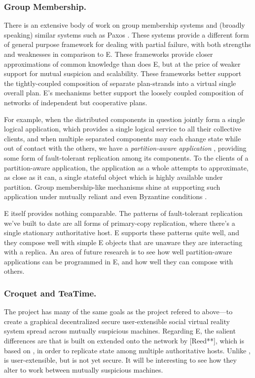 \documentclass{llncs}
\begin{document}
\subsubsection{Group Membership.} There is an extensive body of work
on group membership systems \cite{birman:vsync,amir:thesis} and
(broadly speaking) similar systems such as Paxos
\cite{lamport:paxos}. These systems provide a different form of
general purpose framework for dealing with partial failure, with both
strengths and weaknesses in comparison to E. These frameworks provide
closer approximations of common knowledge than does E, but at the
price of weaker support for mutual suspicion and scalability. These
frameworks better support the tightly-coupled composition of separate
plan-strands into a virtual single overall plan. E's mechanisms better
support the loosely coupled composition of networks of independent but
cooperative plans.

For example, when the distributed components in question jointly form
a single logical application, which provides a single logical service
to all their collective clients, and when multiple separated
components may each change state while out of contact with the others,
we have a \emph{partition-aware application}
\cite{partition-aware,bancomat}, providing some form of fault-tolerant
replication among its components. To the clients of a partition-aware
application, the application as a whole attempts to approximate, as
close as it can, a single stateful object which is highly available
under partition. Group membership-like mechanisms shine at supporting
such application under mutually reliant and even Byzantine conditions
\cite{castro:bft}. 

E itself provides nothing comparable. The patterns of fault-tolerant
replication we've built to date are all forms of primary-copy
replication, where there's a single stationary authoritative host. E
supports these patterns quite well, and they compose well with simple
E objects that are unaware they are interacting with a replica. An
area of future research is to see how well partition-aware
applications can be programmed in E, and how well they can compose
with others.

\subsubsection{Croquet and TeaTime.} The  project has
many of the same goals as the  project refered to
above---to create a graphical decentralized secure user-extensible
social virtual reality system spread across mutually suspicious
machines. Regarding E, the salient differences are that 
is built on  extended onto the network by 
[Reed**], which is based on  \cite{lamport:paxos}, in order
to replicate state among multiple authoritative hosts. Unlike
,  is user-extensible, but is not yet
secure. It will be interesting to see how they alter  to
work between mutually suspicious machines.
\end{document}
